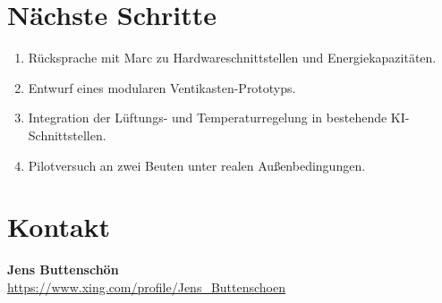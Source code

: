 \documentclass[11pt,a4paper]{article}
\begin{document}
\section{Nächste Schritte}
\begin{enumerate}[topsep=2pt]
  \item Rücksprache mit Marc zu Hardwareschnittstellen und Energiekapazitäten.
  \item Entwurf eines modularen Ventikasten-Prototyps.
  \item Integration der Lüftungs- und Temperaturregelung in bestehende KI-Schnittstellen.
  \item Pilotversuch an zwei Beuten unter realen Außenbedingungen.
\end{enumerate}

\section*{Kontakt}
\textbf{Jens Buttenschön} \\
\small{\url{https://www.xing.com/profile/Jens_Buttenschoen}}
\end{document}
